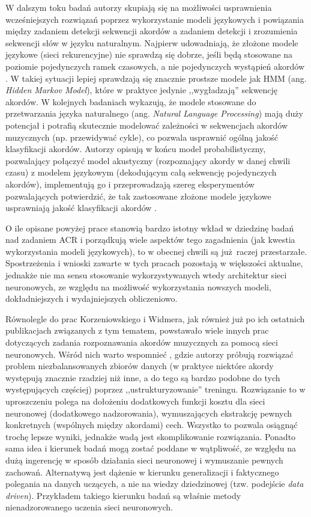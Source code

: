 W dalszym toku badań autorzy skupiają się na możliwości usprawnienia wcześniejszych rozwiązań poprzez wykorzystanie modeli językowych i powiązania między zadaniem detekcji sekwencji akordów a zadaniem detekcji i zrozumienia sekwencji słów w języku naturalnym. Najpierw udowadniają, że złożone modele językowe (sieci rekurencyjne) nie sprawdzą się dobrze, jeśli będą stosowane na poziomie pojedynczych ramek czasowych, a nie pojedynczych wystąpień akordów \cite{korzeniowski_futility_2017}. W takiej sytuacji lepiej sprawdzają się znacznie prostsze modele jak HMM (ang. \emph{Hidden Markov Model}), które w praktyce jedynie ,,wygładzają'' sekwencję akordów. W kolejnych badaniach \cite{korzeniowski_large-scale_2018} wykazują, że modele stosowane do przetwarzania języka naturalnego (ang. \emph{Natural Language Processing}) mają duży potencjał i potrafią skutecznie modelować zależności w sekwencjach akordów muzycznych (np. przewidywać cykle), co pozwala usprawnić ogólną jakość klasyfikacji akordów. Autorzy opisują w końcu model probabilistyczny, pozwalający połączyć model akustyczny (rozpoznający akordy w danej chwili czasu) z modelem językowym (dekodującym całą sekwencję pojedynczych akordów), implementują go i przeprowadzają szereg eksperymentów pozwalających potwierdzić, że tak zastosowane złożone modele językowe usprawniają jakość klasyfikacji akordów \cite{korzeniowski_improved_2018}.

O ile opisane powyżej prace stanowią bardzo istotny wkład w dziedzinę badań nad zadaniem ACR i porządkują wiele aspektów tego zagadnienia (jak kwestia wykorzystania modeli językowych), to w obecnej chwili są już raczej przestarzałe. Spostrzeżenia i wnioski zawarte w tych pracach pozostają w większości aktualne, jednakże nie ma sensu stosowanie wykorzystywanych wtedy architektur sieci neuronowych, ze względu na możliwość wykorzystania nowszych modeli, dokładniejszych i wydajniejszych obliczeniowo.

Równolegle do prac Korzeniowskiego i Widmera, jak również już po ich ostatnich publikacjach związanych z tym tematem, powstawało wiele innych prac dotyczących zadania rozpoznawania akordów muzycznych za pomocą sieci neuronowych. Wśród nich warto wspomnieć \cite{mcfee_structured_2017}, gdzie autorzy próbują rozwiązać problem niezbalansowanych zbiorów danych (w praktyce niektóre akordy występują znacznie rzadziej niż inne, a do tego są bardzo podobne do tych występujących częściej) poprzez ,,ustrukturyzowanie'' treningu. Rozwiązanie to w uproszczeniu polega na dołożeniu dodatkowych funkcji kosztu dla sieci neuronowej (dodatkowego nadzorowania), wymuszających ekstrakcję pewnych konkretnych (wspólnych między akordami) cech. Wszystko to pozwala osiągnąć trochę lepsze wyniki, jednakże wadą jest skomplikowanie rozwiązania. Ponadto sama idea i kierunek badań mogą zostać poddane w wątpliwość, ze względu na dużą ingerencję w sposób działania sieci neuronowej i wymuszanie pewnych zachowań. Alternatywą jest dążenie w kierunku generalizacji i faktycznego polegania na danych uczących, a nie na wiedzy dziedzinowej (tzw. podejście \emph{data driven}). Przykładem takiego kierunku badań są właśnie metody nienadzorowanego uczenia sieci neuronowych.

